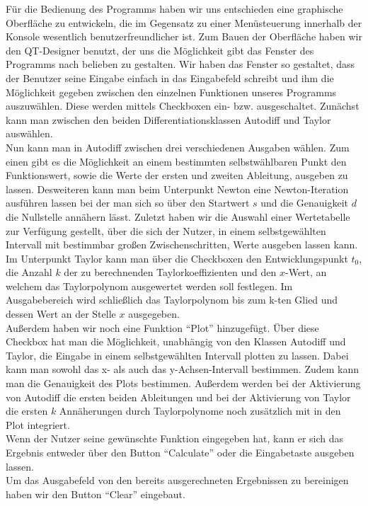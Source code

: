 \documentclass{scrartcl}
\begin{document}
Für die Bedienung des Programms haben wir uns entschieden eine graphische Oberfläche zu entwickeln, die im Gegensatz zu einer Menüsteuerung innerhalb der Konsole wesentlich benutzerfreundlicher ist. Zum Bauen der Oberfläche haben wir den QT-Designer benutzt, der uns die Möglichkeit gibt das Fenster des Programms nach belieben zu gestalten. Wir haben das Fenster so gestaltet, dass der Benutzer seine Eingabe einfach in das Eingabefeld schreibt und ihm die Möglichkeit gegeben zwischen den einzelnen Funktionen unseres Programms auszuwählen. Diese werden mittels Checkboxen ein- bzw. ausgeschaltet. Zunächst kann man zwischen den beiden Differentiationsklassen Autodiff und Taylor auswählen. \\
Nun kann man in Autodiff zwischen drei verschiedenen Ausgaben wählen. Zum einen gibt es die Möglichkeit an einem bestimmten selbstwählbaren Punkt den Funktionswert, sowie die Werte der ersten und zweiten Ableitung, ausgeben zu lassen. Desweiteren kann man beim Unterpunkt Newton eine Newton-Iteration ausführen lassen bei der man sich so über den Startwert $s$ und die Genauigkeit $d$ die Nullstelle annähern lässt. \mbox{Zuletzt} haben wir die Auswahl einer Wertetabelle zur Verfügung gestellt, über die sich der Nutzer, in einem selbstgewählten Intervall mit bestimmbar großen Zwischenschritten, Werte ausgeben lassen kann.\\
Im Unterpunkt Taylor kann man über die Checkboxen den Entwicklungspunkt $t_0$, die Anzahl $k$ der zu berechnenden Taylorkoeffizienten  und den $x$-Wert, an welchem das Taylorpolynom ausgewertet werden soll festlegen. Im Ausgabebereich wird schließlich das Taylorpolynom bis zum k-ten Glied und dessen Wert an der Stelle $x$ ausgegeben.\\
Außerdem haben wir noch eine Funktion "`Plot"' hinzugefügt. Über diese Checkbox hat man die Möglichkeit, unabhängig von den Klassen Autodiff und Taylor, die Eingabe in einem selbstgewählten Intervall plotten zu lassen. Dabei kann man sowohl das x- als auch das y-Achsen-Intervall bestimmen. Zudem kann man die Genauigkeit des Plots bestimmen. Außerdem werden bei der Aktivierung von Autodiff die ersten beiden Ableitungen und bei der Aktivierung von Taylor die ersten $k$ Annäherungen durch Taylorpolynome noch zusätzlich mit in den Plot integriert.\\
Wenn der Nutzer seine gewünschte Funktion eingegeben hat, kann er sich das Ergebnis entweder über den Button "`Calculate"' oder die Eingabetaste ausgeben lassen.\\
Um das Ausgabefeld von den bereits ausgerechneten Ergebnissen zu bereinigen haben wir den Button "`Clear"' eingebaut.\\
\end{document}
